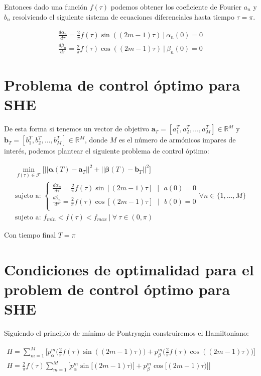Entonces dado una función $f(\tau)$ podemos obtener los coeficiente de Fourier $a_n$ y $b_n$ resolviendo el siguiente sistema de ecuaciones diferenciales hasta tiempo $\tau=\pi$.

\begin{gather}
    \frac{d \alpha_n}{d\tau} = \frac{2}{\pi}f(\tau) \sin((2m-1)\tau) \ | \ \alpha_n(0) = 0 \\
    \frac{d \beta_n}{d\tau} = \frac{2}{\pi}f(\tau) \cos((2m-1)\tau) \ | \ \beta_n(0) = 0
\end{gather}

\section{Problema de control óptimo para SHE}
De esta forma si tenemos un vector de objetivo $\bm{a}_T = [a_1^T,a_2^T,\dots,a_{M}^T] \in \mathbb{R}^M$ y  $\bm{b}_T = [b_1^T,b_2^T,\dots,b_{M}^T] \in \mathbb{R}^M$, donde $M$ es el número de armónicos impares de interés, podemos plantear el siguiente problema de control óptimo:

\begin{gather}
    \min_{f(\tau) \in \mathcal{F}} \big[  || \bm{\alpha}(T) - \bm{a}_T ||^2  + || \bm{\beta}(T) - \bm{b}_T ||^2 \big] \\
    \text{sujeto a: }
    \begin{cases}
        \frac{d \alpha_n}{d\tau} = \frac{2}{\pi}  f(\tau) \sin[(2m-1) \tau ] \ \ \ | \ \ \ a(0) = 0   \\
        \frac{d \beta_n}{d\tau}  = \frac{2}{\pi}  f(\tau) \cos[(2m-1) \tau ] \ \ \ | \ \ \ b(0) = 0   \\
    \end{cases}
    \forall n \in \{ 1, \dots,M\}  \\ 
    \text{sujeto a: } f_{min} < f(\tau) < f_{max} \ | \ \forall \ \tau \in (0,\pi)  
\end{gather}

Con tiempo final $T = \pi$


\section{Condiciones de optimalidad  para el problem de control óptimo para SHE}


Siguiendo el principio de mínimo de Pontryagin construiremos el Hamiltoniano:

\begin{gather}
    H = \sum_{m=1}^M \Bigg[ p_\alpha^m \Bigg(\frac{2}{\pi} f(\tau) \sin((2m-1)\tau)\Bigg) + p_\beta^m \Bigg(\frac{2}{\pi} f(\tau) \cos((2m-1)\tau)\Bigg) \Bigg] \\
    H = \frac{2}{\pi} f(\tau)\sum_{m=1}^M \Bigg[  p_\alpha^m   \sin \big[(2m-1)\tau)\big] 
                                                + p_\beta^m   \cos \big[ (2m-1)\tau)\big] \Bigg]
\end{gather}
 

